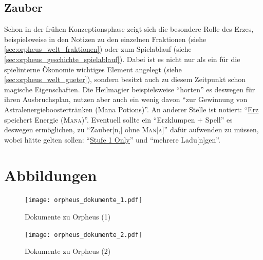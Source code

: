\documentclass[a5paper,pagesize,numbers=noenddot]{scrbook}
\begin{document}
\section{Zauber}\label{sec:phoenix_zauber}
Schon in der frühen Konzeptionsphase zeigt sich die besondere Rolle des Erzes, beispielsweise in den Notizen zu den einzelnen Fraktionen (siehe \autoref{sec:orpheus_welt_fraktionen}) oder zum Spielablauf (siehe \autoref{sec:orpheus_geschichte_spielablauf}).
Dabei ist es nicht nur als ein für die spielinterne Ökonomie wichtiges Element angelegt (siehe \autoref{sec:orpheus_welt_gueter}), sondern besitzt auch zu diesem Zeitpunkt schon magische Eigenschaften.
Die Heilmagier beispielsweise \enquote{horten} es deswegen für ihren Ausbruchsplan, nutzen aber auch ein wenig davon \enquote{zur Gewinnung von Astralenergieboostertränken (Mana Potions)}.\autocite[S.~7]{orpheus_gildensystem}
An anderer Stelle ist notiert:
\enquote{\uline{Erz} speichert Energie (\textsc{Mana})}.
Eventuell sollte ein \enquote{Erzklumpen $+$ Spell} es deswegen ermöglichen, zu \enquote{Zauber[n,] ohne \textsc{Man[a]}} dafür aufwenden zu müssen, wobei hätte gelten sollen:
\enquote{\uline{Stufe 1 Only}} und \enquote{mehrere Ladu[n]gen}.\autocite[S.~6]{orpheus_b_scribbles}


\clearpage
{}
\printbibliography


\clearpage
{}
\appendix
\renewcommand{\thefigure}{\arabic{figure}}

\chapter{Abbildungen}\label{ch:anhang_abbildungen}
\begin{figure}
   \centering
   \texttt{[image: orpheus\_dokumente\_1.pdf]}
   \caption{Dokumente zu Orpheus (1)}
   \label{fig:orpheus_dokumente_1}
\end{figure}

\begin{figure}
   \centering
   \texttt{[image: orpheus\_dokumente\_2.pdf]}
   \caption{Dokumente zu Orpheus (2)}
   \label{fig:orpheus_dokumente_2}
\end{figure}
\end{document}
